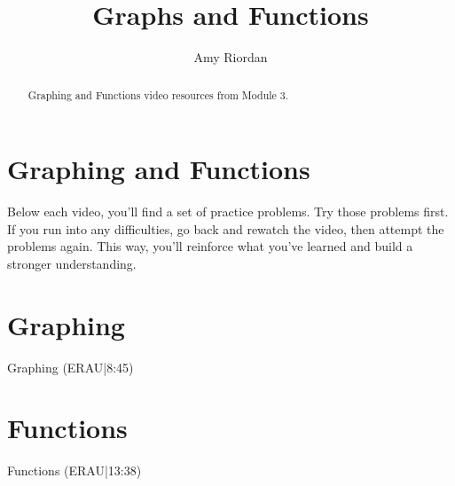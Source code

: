 \documentclass{ximera}
\title{Graphs and Functions}
\author{Amy Riordan}
\begin{document}
\begin{abstract}
Graphing and Functions video resources from Module 3.
\end{abstract}
\maketitle

\section*{Graphing and Functions}

Below each video, you’ll find a set of practice problems. Try those problems first. If you run into any difficulties, go back and rewatch the video, then attempt the problems again. This way, you’ll reinforce what you’ve learned and build a stronger understanding.

\section*{Graphing}

Graphing (ERAU|8:45)




\section*{Functions}

Functions (ERAU|13:38)

\end{document}
